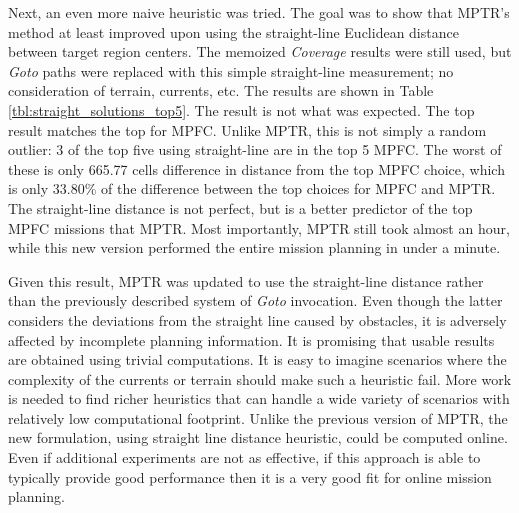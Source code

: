 \documentclass{tamuccthesis}
\begin{document}
Next, an even more naive heuristic was tried. The goal was to show that MPTR's method at least improved upon using the straight-line Euclidean distance between target region centers. The memoized \textit{Coverage} results were still used, but \textit{Goto} paths were replaced with this simple straight-line measurement; no consideration of terrain, currents, etc. The results are shown in Table \ref{tbl:straight_solutions_top5}. The result is not what was expected. The top result matches the top for MPFC. Unlike MPTR, this is not simply a random outlier: 3 of the top five using straight-line are in the top 5 MPFC. The worst of these is only 665.77 cells difference in distance from the top MPFC choice, which is only $33.80\%$ of the difference between the top choices for MPFC and MPTR. The straight-line distance is not perfect, but is a better predictor of the top MPFC missions that MPTR. Most importantly, MPTR still took almost an hour, while this new version performed the entire mission planning in under a minute. 

Given this result, MPTR was updated to use the straight-line distance rather than the previously described system of \textit{Goto} invocation. Even though the latter considers the deviations from the straight line caused by obstacles, it is adversely affected by incomplete planning information. It is promising that usable results are obtained using trivial computations. It is easy to imagine scenarios where the complexity of the currents or terrain should make such a heuristic fail. More work is needed to find richer heuristics that can handle a wide variety of scenarios with relatively low computational footprint. Unlike the previous version of MPTR, the new formulation, using straight line distance heuristic, could be computed online. Even if additional experiments are not as effective, if this approach is able to typically provide good performance then it is a very good fit for online mission planning. 
\end{document}
